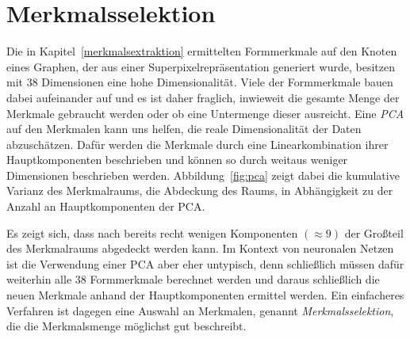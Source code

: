 \section{Merkmalsselektion}
\label{merkmalsselektion}

Die in Kapitel~\ref{merkmalsextraktion} ermittelten Formmerkmale auf den Knoten eines Graphen, der aus einer Superpixelrepräsentation generiert wurde, besitzen mit $38$ Dimensionen eine hohe Dimensionalität.
Viele der Formmerkmale bauen dabei aufeinander auf und es ist daher fraglich, inwieweit die gesamte Menge der Merkmale gebraucht werden oder ob eine Untermenge dieser ausreicht.
Eine \emph{\gls{PCA}} auf den Merkmalen kann uns helfen, die reale Dimensionalität der Daten abzuschätzen.
Dafür werden die Merkmale durch eine Linearkombination ihrer Hauptkomponenten beschrieben und können so durch weitaus weniger Dimensionen beschrieben werden.
Abbildung~\ref{fig:pca} zeigt dabei die kumulative Varianz des Merkmalraums, \dhe{} die Abdeckung des Raums, in Abhängigkeit zu der Anzahl an Hauptkomponenten der \gls{PCA}.

Es zeigt sich, dass nach bereits recht wenigen Komponenten $\left(\approx 9\right)$ der Großteil des Merkmalraums abgedeckt werden kann.
Im Kontext von neuronalen Netzen ist die Verwendung einer \gls{PCA} aber eher untypisch, denn schließlich müssen dafür weiterhin alle $38$ Formmerkmale berechnet werden und daraus schließlich die neuen Merkmale anhand der Hauptkomponenten ermittel werden.
Ein einfacheres Verfahren ist dagegen eine Auswahl an Merkmalen, genannt \emph{Merkmalsselektion}, die die Merkmalsmenge möglichst gut beschreibt.
